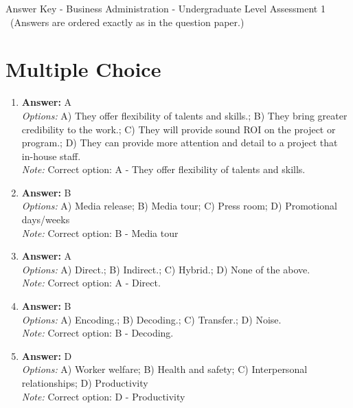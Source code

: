 \documentclass[12pt]{article}
\begin{document}
\begin{center}
Answer Key - Business Administration - Undergraduate Level Assessment 1 \
\small (Answers are ordered exactly as in the question paper.)
\end{center}

\section*{Multiple Choice}
\begin{enumerate}[label=\arabic*.]
\item \textbf{Answer:} A
\\ \textit{Options:} A) They offer flexibility of talents and skills.; B) They bring greater credibility to the work.; C) They will provide sound ROI on the project or program.; D) They can provide more attention and detail to a project that in-house staff.
\\ \textit{Note:} Correct option: A - They offer flexibility of talents and skills.
\item \textbf{Answer:} B
\\ \textit{Options:} A) Media release; B) Media tour; C) Press room; D) Promotional days/weeks
\\ \textit{Note:} Correct option: B - Media tour
\item \textbf{Answer:} A
\\ \textit{Options:} A) Direct.; B) Indirect.; C) Hybrid.; D) None of the above.
\\ \textit{Note:} Correct option: A - Direct.
\item \textbf{Answer:} B
\\ \textit{Options:} A) Encoding.; B) Decoding.; C) Transfer.; D) Noise.
\\ \textit{Note:} Correct option: B - Decoding.
\item \textbf{Answer:} D
\\ \textit{Options:} A) Worker welfare; B) Health and safety; C) Interpersonal relationships; D) Productivity
\\ \textit{Note:} Correct option: D - Productivity
\end{enumerate}
\end{document}
